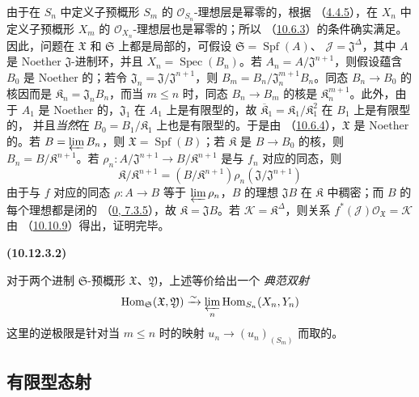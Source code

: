 \documentclass[UTF8,fontset=none,11pt,oneside,openany]{ctexbook}
\newenvironment{env}[1][]{%
  \par\medskip\noindent\textbf{(#1)}\ %
}{\par}
\let\EGAOriginalLabel\label
\renewcommand{\label}[1]{\phantomsection\EGAOriginalLabel{#1}}
\begin{document}
由于在 $S_n$ 中定义子预概形 $S_m$ 的
$\mathscr{O}_{S_n}$-理想层是幂零的，根据
（\hyperref[I.4.4.5-fr]{4.4.5}），在 $X_n$ 中定义子预概形 $X_m$ 的
$\mathscr{O}_{X_n}$-理想层也是幂零的；所以
（\hyperref[I.10.6.3-fr]{10.6.3}）的条件确实满足。因此，问题在
$\mathfrak{X}$ 和 $\mathfrak{S}$ 上都是局部的，可假设
$\mathfrak{S}=\operatorname{Spf}(A)$、
$\mathscr{J}=\mathfrak{J}^\Delta$，其中 $A$ 是 Noether
$\mathfrak{J}$-进制环，并且 $X_n=\operatorname{Spec}(B_n)$。若
$A_n=A/\mathfrak{J}^{n+1}$，则假设蕴含 $B_0$ 是 Noether 的；若令
$\mathfrak{J}_n=\mathfrak{J}/\mathfrak{J}^{n+1}$，则
$B_m=B_n/\mathfrak{J}_n^{m+1}B_n$。同态 $B_n\to B_0$ 的核因而是
$\mathfrak{K}_n=\mathfrak{J}_nB_n$，而当 $m\leq n$ 时，同态
$B_n\to B_m$ 的核是 $\mathfrak{K}_n^{m+1}$。此外，由于 $A_1$ 是
Noether 的，$\mathfrak{J}_1$ 在 $A_1$ 上是有限型的，故
$\overline{\mathfrak{K}}_1=\mathfrak{K}_1/\mathfrak{K}_1^2$ 在 $B_1$ 上是有限型的，
并且\emph{当然}在 $B_0=B_1/\mathfrak{K}_1$ 上也是有限型的。于是由
（\hyperref[I.10.6.4-fr]{10.6.4}），$\mathfrak{X}$ 是 Noether 的。若
$B=\varprojlim B_n$，则 $\mathfrak{X}=\operatorname{Spf}(B)$；若
$\mathfrak{K}$ 是 $B\to B_0$ 的核，则
$B_n=B/\mathfrak{K}^{n+1}$。若
$\rho_n:A/\mathfrak{J}^{n+1}\to B/\mathfrak{K}^{n+1}$ 是与 $f_n$ 对应的同态，则
\[
  \mathfrak{K}/\mathfrak{K}^{n+1}
  =(B/\mathfrak{K}^{n+1})\rho_n(\mathfrak{J}/\mathfrak{J}^{n+1})
\]
由于与 $f$ 对应的同态 $\rho:A\to B$ 等于
$\varprojlim\rho_n$，$B$ 的理想 $\mathfrak{J}B$ 在 $\mathfrak{K}$ 中稠密；而
$B$ 的每个理想都是闭的
（\hyperref[0.7.3.5-fr]{0, 7.3.5}），故
$\mathfrak{K}=\mathfrak{J}B$。若 $\mathscr{K}=\mathfrak{K}^\Delta$，则关系
$f^*(\mathscr{J})\mathscr{O}_{\mathfrak{X}}=\mathscr{K}$ 由
（\hyperref[I.10.10.9-fr]{10.10.9}）得出，证明完毕。

\begin{env}[10.12.3.2]
\label{I.10.12.3.2-fr}
对于两个进制 $\mathfrak{S}$-预概形 $\mathfrak{X}$、$\mathfrak{Y}$，上述等价给出一个
\emph{典范双射}
\[
  \operatorname{Hom}_{\mathfrak{S}}(\mathfrak{X},\mathfrak{Y})
  \xrightarrow{\sim}
  \varprojlim_n\operatorname{Hom}_{S_n}(X_n,Y_n)
\]
这里的逆极限是针对当 $m\leq n$ 时的映射
$u_n\to(u_n)_{(S_m)}$ 而取的。
\end{env}

\subsection{有限型态射}
\label{subsection:I.10.13-fr}
\end{document}
